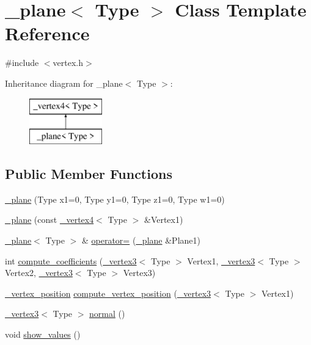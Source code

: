 \hypertarget{class__plane}{\section{\+\_\+plane$<$ Type $>$ Class Template Reference}
\label{class__plane}
}


{\ttfamily \#include $<$vertex.\+h$>$}

Inheritance diagram for \+\_\+plane$<$ Type $>$\+:\begin{figure}[H]
\begin{center}
\leavevmode
\includegraphics[height=2.000000cm]{class__plane}
\end{center}
\end{figure}
\subsection*{Public Member Functions}
\begin{DoxyCompactItemize}
\item 
\hyperlink{class__plane_abafcad1d36ec0cc2138d7a2fa7aa6246}{\+\_\+plane} (Type x1=0, Type y1=0, Type z1=0, Type w1=0)
\item 
\hyperlink{class__plane_ae7e80214cbb5d13c5f79715fec65490f}{\+\_\+plane} (const \hyperlink{class__vertex4}{\+\_\+vertex4}$<$ Type $>$ \&Vertex1)
\item 
\hyperlink{class__plane}{\+\_\+plane}$<$ Type $>$ \& \hyperlink{class__plane_add0ad8099978ac74fc3fa6c3ffe46847}{operator=} (\hyperlink{class__plane}{\+\_\+plane} \&Plane1)
\item 
int \hyperlink{class__plane_a291e8521201526dfe9133f595669121f}{compute\+\_\+coefficients} (\hyperlink{class__vertex3}{\+\_\+vertex3}$<$ Type $>$ Vertex1, \hyperlink{class__vertex3}{\+\_\+vertex3}$<$ Type $>$ Vertex2, \hyperlink{class__vertex3}{\+\_\+vertex3}$<$ Type $>$ Vertex3)
\item 
\hyperlink{vertex_8h_a2fc25f5ba8b6791cc76d4a49e06d6e8c}{\+\_\+vertex\+\_\+position} \hyperlink{class__plane_a6e4f08e519d6d15eaf667d7b5e9c515b}{compute\+\_\+vertex\+\_\+position} (\hyperlink{class__vertex3}{\+\_\+vertex3}$<$ Type $>$ Vertex1)
\item 
\hyperlink{class__vertex3}{\+\_\+vertex3}$<$ Type $>$ \hyperlink{class__plane_a9d74741f6fba658ad2a09f92145af878}{normal} ()
\item 
void \hyperlink{class__plane_ac73d74bef9360a384739e653809f36f0}{show\+\_\+values} ()
\end{DoxyCompactItemize}

